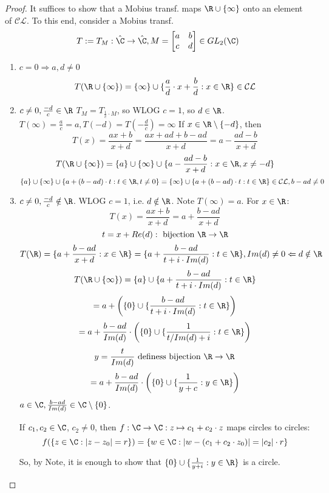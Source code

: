 \begin{proof}
  It suffices to show that a Mobius transf. maps $\R\cup\{\infty\}$ onto an element of $\mathcal{CL}$. To this end, consider a Mobius transf.
    $$T:=T_M:\hat{\C}\to \hat{\C}, M=
\begin{bmatrix}
    a & b \\
    c & d
\end{bmatrix}
    \in GL_2(\C)$$
\begin{enumerate}[Case (1)]
  \item $c=0 \Rightarrow a,d \neq 0$
    $$T(\R\cup\{\infty\})=\{\infty\}\cup \{\frac{a}{d} \cdot x+\frac{b}{d}: x\in \R\}\in \mathcal{CL}$$
  \item $c\neq 0, \frac{-d}{c}\in \R$ \newline
    $T_M=T_{\frac{1}{c} \cdot M}$, so WLOG $c=1$, so $d\in \R$.
    \newline $T(\infty)=\frac{a}{c}=a, T(-d)=T(-\frac{d}{c})=\infty$
    \newline If $x\in \R\setminus\{-d\}$, then
      $$T(x)=\frac{ax+b}{x+d}=\frac{ax+ad+b-ad}{x+d}=a-\frac{ad-b}{x+d}$$
    $$T(\R\cup\{\infty\})=\{a\}\cup\{\infty\}\cup\{a-\frac{ad-b}{x+d}:x\in\R,x\neq -d\}$$
    $$\{a\}\cup\{\infty\}\cup\{a+(b-ad) \cdot t:t\in \R, t\neq 0\}=\{\infty\}\cup\{a+(b-ad) \cdot t:t\in \R\}\in \mathcal{CL}, b-ad\neq 0$$
  \item $c\neq 0, \frac{-d}{c}\notin \R$.
  \newline WLOG $c=1$, i.e. $d\notin \R$. Note $T(\infty)=a$. For $x\in \R$:
    $$T(x)=\frac{ax+b}{x+d}=a+\frac{b-ad}{x+d}$$
    $$t=x+Re(d): \text{ bijection }\R\to\R$$
    $$T(\R)=\{a+\frac{b-ad}{x+d}:x\in \R\}=\{a+\frac{b-ad}{t+i \cdot Im(d)}: t\in \R\}, Im(d)\neq 0 \Leftarrow d\notin \R$$
    $$T(\R\cup\{\infty\})=\{a\}\cup\{a+\frac{b-ad}{t+i \cdot Im(d)}: t\in \R\}$$
    $$=a+\left(\{0\}\cup\{\frac{b-ad}{t+i \cdot Im(d)}: t\in \R\}\right)$$
    $$=a+\frac{b-ad}{Im(d)} \cdot \left(\{0\}\cup\{\frac{1}{t/Im(d)+i}:t\in \R\}\right)$$
    $$y=\frac{t}{Im(d)} \text{ definess bijection }\R\to\R$$
    $$=a+\frac{b-ad}{Im(d)} \cdot \left(\{0\}\cup \{\frac{1}{y+c}:y\in\R\}\right)$$
    $a\in \C, \frac{b-ad}{Im(d)}\in \C\setminus\{0\}$.
    \begin{note}
      If $c_1,c_2\in \C$, $c_2\neq 0$, then $f:\C\to\C:z\mapsto c_1+c_2 \cdot z$ maps circles to circles:
        $$f(\{z\in\C: |z-z_0|=r\})=\{w\in \C:|w-(c_1+c_2 \cdot z_0)|=|c_2| \cdot r\}$$
    \end{note}
    So, by Note,  it is enough to show that $\{0\}\cup\{\frac{1}{y+i}:y\in\R\}$ is a circle.

\end{enumerate}
\end{proof}
